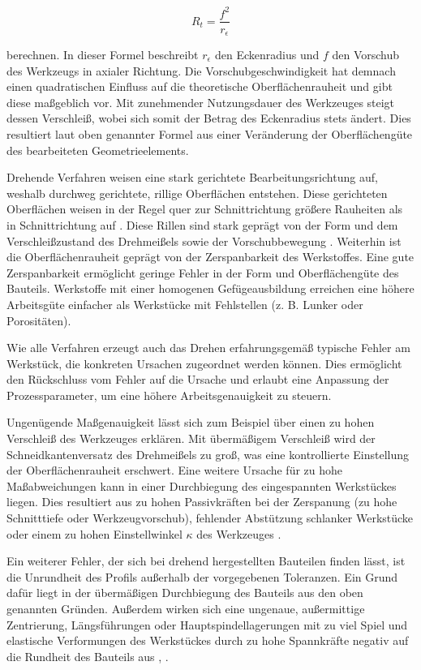 \begin{equation*}
	R_{t}=\frac{f^{2}}{r_{\epsilon}}
\end{equation*}

berechnen. In dieser Formel beschreibt $r_{\epsilon}$ den Eckenradius und $f$ den Vorschub des Werkzeugs in axialer Richtung. Die Vorschubgeschwindigkeit hat demnach einen quadratischen Einfluss auf die theoretische Oberflächenrauheit und gibt diese maßgeblich vor. Mit zunehmender Nutzungsdauer des Werkzeuges steigt dessen Verschleiß, wobei sich somit der Betrag des Eckenradius stets ändert. Dies resultiert laut oben genannter Formel aus einer Veränderung der Oberflächengüte des bearbeiteten Geometrieelements. 

Drehende Verfahren weisen eine stark gerichtete Bearbeitungsrichtung auf, weshalb durchweg gerichtete, rillige Oberflächen entstehen. Diese gerichteten Oberflächen weisen in der Regel quer zur Schnittrichtung größere Rauheiten als in Schnittrichtung auf \cite{Denkena.2011}.
Diese Rillen sind stark geprägt von der Form und dem Verschleißzustand des Drehmeißels sowie der Vorschubbewegung \cite{Paucksch.2008}.
Weiterhin ist die Oberflächenrauheit geprägt von der Zerspanbarkeit des Werkstoffes. Eine gute Zerspanbarkeit ermöglicht geringe Fehler in der Form und Oberflächengüte des Bauteils. Werkstoffe mit einer homogenen Gefügeausbildung erreichen eine höhere Arbeitsgüte einfacher als Werkstücke mit Fehlstellen (z. B. Lunker oder Porositäten).

Wie alle Verfahren erzeugt auch das Drehen erfahrungsgemäß typische Fehler am Werkstück, die konkreten Ursachen zugeordnet werden können. Dies ermöglicht den Rückschluss vom Fehler auf die Ursache und erlaubt eine Anpassung der Prozessparameter, um eine höhere Arbeitsgenauigkeit zu steuern. 

Ungenügende Maßgenauigkeit lässt sich zum Beispiel über einen zu hohen Verschleiß des Werkzeuges erklären. Mit übermäßigem Verschleiß wird der Schneidkantenversatz des Drehmeißels zu groß, was eine kontrollierte Einstellung der Oberflächenrauheit erschwert. Eine weitere Ursache für zu hohe Maßabweichungen kann in einer Durchbiegung des eingespannten Werkstückes liegen. Dies resultiert aus zu hohen Passivkräften bei der Zerspanung (zu hohe Schnitttiefe oder Werkzeugvorschub), fehlender Abstützung schlanker Werkstücke oder einem zu hohen Einstellwinkel $\kappa$ des Werkzeuges \cite{Schonherr.2002}.

Ein weiterer Fehler, der sich bei drehend hergestellten Bauteilen finden lässt, ist die Unrundheit des Profils außerhalb der vorgegebenen Toleranzen. Ein Grund dafür liegt in der übermäßigen Durchbiegung des Bauteils aus den oben genannten Gründen. Außerdem wirken sich eine ungenaue, außermittige Zentrierung, Längsführungen oder Hauptspindellagerungen mit zu viel Spiel und elastische Verformungen des Werkstückes durch zu hohe Spannkräfte negativ auf die Rundheit des Bauteils aus \cite{Dietrich.2014}, \cite{Schonherr.2002}. 

